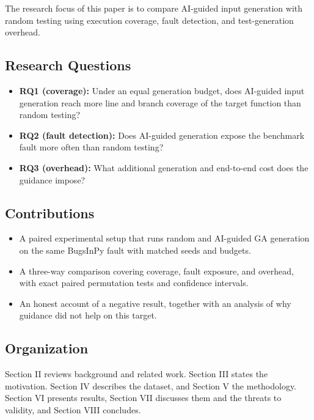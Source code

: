 \documentclass[12pt,onecolumn]{IEEEtran}
\begin{document}
The research focus of this paper is to compare AI-guided input generation with random testing using execution coverage, fault detection, and test-generation overhead.

\subsection{Research Questions}

\begin{itemize}
    \item \textbf{RQ1 (coverage):} Under an equal generation budget, does AI-guided input generation reach more line and branch coverage of the target function than random testing?
    \item \textbf{RQ2 (fault detection):} Does AI-guided generation expose the benchmark fault more often than random testing?
    \item \textbf{RQ3 (overhead):} What additional generation and end-to-end cost does the guidance impose?
\end{itemize}

\subsection{Contributions}

\begin{itemize}
    \item A paired experimental setup that runs random and AI-guided GA generation on the same BugsInPy fault with matched seeds and budgets.
    \item A three-way comparison covering coverage, fault exposure, and overhead, with exact paired permutation tests and confidence intervals.
    \item An honest account of a negative result, together with an analysis of why guidance did not help on this target.
\end{itemize}

\subsection{Organization}

Section II reviews background and related work. Section III states the motivation. Section IV describes the dataset, and Section V the methodology. Section VI presents results, Section VII discusses them and the threats to validity, and Section VIII concludes.

\end{document}
